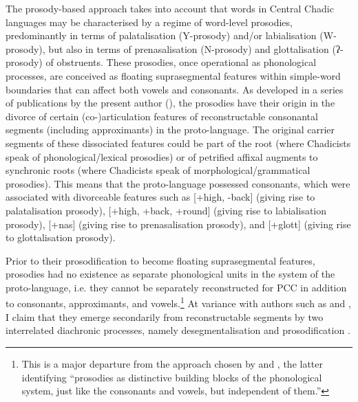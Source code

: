 \documentclass[output=paper]{langscibook}
\begin{document}
The prosody-based approach takes into account that words in Central Chadic languages may be characterised by a regime of word-level prosodies, predominantly in terms of palatalisation (Y-prosody) and/or labialisation (W-prosody), but also in terms of prenasalisation (N-prosody) and glottalisation (ʔ-prosody) of obstruents. These prosodies, once operational as phonological processes, are conceived as floating suprasegmental features within simple-word boundaries that can affect both vowels and consonants. As developed in a series of publications by the present author (\citealt{Wolff1981, Wolff1983a, Wolff2004, Wolff2006, Wolff2017, Wolff2019, Wolff2022a}), the prosodies have their origin in the divorce of certain (co-)articulation features of reconstructable consonantal segments (including approximants) in the proto-language. The original carrier segments of these dissociated features could be part of the root (where Chadicists speak of phonological/lexical prosodies) or of petrified affixal augments to synchronic roots (where Chadicists speak of morphological/grammatical prosodies). This means that the proto-language possessed consonants, which were associated with divorceable features such as [+high, -back] (giving rise to palatalisation prosody), [+high, +back, +round] (giving rise to labialisation prosody), [+nas] (giving rise to prenasalisation prosody), and [+glott] (giving rise to glottalisation prosody). 

\largerpage
Prior to their prosodification to become floating suprasegmental features, prosodies had no existence as separate phonological units in the system of the proto-lan\-guage, i.e. they cannot be separately reconstructed for PCC in addition to consonants, approximants, and vowels.\footnote{This is a major departure from the approach chosen by \citet{Gravina2014} and \citet{Roberts2001}, the latter identifying “prosodies as distinctive building blocks of the phonological system, just like the consonants and vowels, but independent of them.”}  At variance with authors such as \citet{Roberts2001} and \citet{Gravina2014}, I claim that they emerge secondarily from reconstructable segments by two interrelated diachronic processes, namely desegmentalisation and prosodification \citep{Wolff2022a}. 
\end{document}
